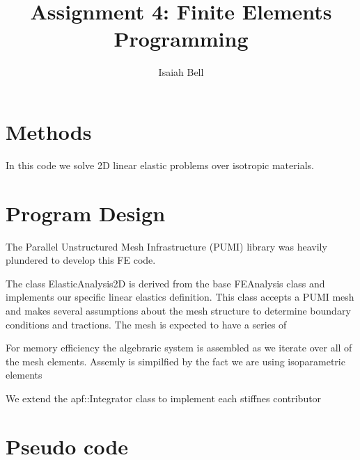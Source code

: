 \documentclass{article}
\begin{document}
\title{Assignment 4: Finite Elements Programming}
\author{Isaiah Bell} 
\maketitle

\section{Methods}

In this code we solve 2D linear elastic problems over isotropic materials.


\section{Program Design}

The Parallel Unstructured Mesh Infrastructure (PUMI) library was heavily plundered to develop this FE code.

The class ElasticAnalysis2D is derived from the base FEAnalysis class and implements
our specific linear elastics definition. This class accepts a PUMI mesh and makes
several assumptions about the mesh structure to determine boundary conditions and
tractions. The mesh is expected to have a series of  

For memory efficiency the algebraric system is assembled as we iterate over all of the
mesh elements. Assemly is simpilfied by the fact we are using isoparametric elements

We extend the apf::Integrator class to implement each stiffnes contributor






\section{Pseudo code}

\begin{algorithm}
\begin{algorithmic}

    
\EndProcedure

\end{algorithmic}
\end{algorithm}



\end{document}
